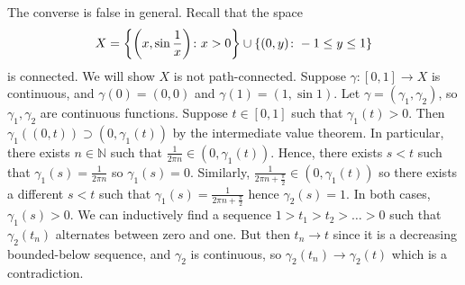 \begin{example}
	The converse is false in general.
	Recall that the space
	\[
		X = \qty{\qty(x, \sin \frac{1}{x}) \colon x > 0} \cup \qty{(0,y) \colon -1 \leq y \leq 1}
	\]
	is connected.
	We will show \( X \) is not path-connected.
	Suppose \( \gamma \colon [0,1] \to X \) is continuous, and \( \gamma(0) = (0,0) \) and \( \gamma(1) = (1, \sin 1) \).
	Let \( \gamma = (\gamma_1, \gamma_2) \), so \( \gamma_1, \gamma_2 \) are continuous functions.
	Suppose \( t \in [0,1] \) such that \( \gamma_1(t) > 0 \).
	Then \( \gamma_1((0,t)) \supset (0, \gamma_1(t)) \) by the intermediate value theorem.
	In particular, there exists \( n \in \mathbb N \) such that \( \frac{1}{2\pi n} \in (0, \gamma_1(t)) \).
	Hence, there exists \( s < t \) such that \( \gamma_1(s) = \frac{1}{2\pi n} \) so \( \gamma_1(s) = 0 \).
	Similarly, \( \frac{1}{2\pi n + \frac{\pi}{2}} \in (0, \gamma_1(t)) \) so there exists a different \( s < t \) such that \( \gamma_1(s) = \frac{1}{2\pi n + \frac{\pi}{2}} \) hence \( \gamma_2(s) = 1 \).
	In both cases, \( \gamma_1(s) > 0 \).
	We can inductively find a sequence \( 1 > t_1 > t_2 > \dots > 0 \) such that \( \gamma_2(t_n) \) alternates between zero and one.
	But then \( t_n \to t \) since it is a decreasing bounded-below sequence, and \( \gamma_2 \) is continuous, so \( \gamma_2(t_n) \to \gamma_2(t) \) which is a contradiction.
\end{example}

